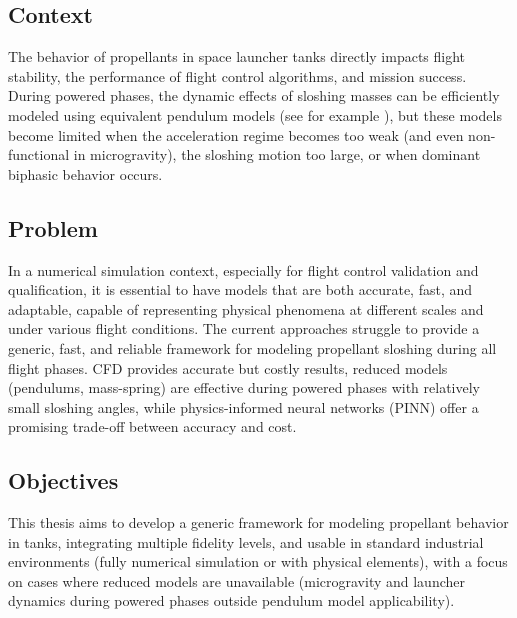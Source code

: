\documentclass[12pt]{article}
\begin{document}
	\subsection*{Context}
	
	The behavior of propellants in space launcher tanks directly impacts flight stability, the performance of flight control algorithms, and mission success. During powered phases, the dynamic effects of sloshing masses can be efficiently modeled using equivalent pendulum models (see for example \cite{ibrahimLiquidSloshingDynamics2005a}), but these models become limited when the acceleration regime becomes too weak (and even non-functional in microgravity), the sloshing motion too large, or when dominant biphasic behavior occurs.
	
	\subsection*{Problem}
	
	In a numerical simulation context, especially for flight control validation and qualification, it is essential to have models that are both accurate, fast, and adaptable, capable of representing physical phenomena at different scales and under various flight conditions.
	The current approaches struggle to provide a generic, fast, and reliable framework for modeling propellant sloshing during all flight phases. CFD provides accurate but costly results, reduced models (pendulums, mass-spring) are effective during powered phases with relatively small sloshing angles, while physics-informed neural networks (PINN) offer a promising trade-off between accuracy and cost.
	
	\subsection*{Objectives}
	
	This thesis aims to develop a generic framework for modeling propellant behavior in tanks, integrating multiple fidelity levels, and usable in standard industrial environments (fully numerical simulation or with physical elements), with a focus on cases where reduced models are unavailable (microgravity and launcher dynamics during powered phases outside pendulum model applicability).
	
\end{document}
